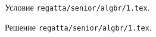 \problem
Условие \texttt{regatta/senior/algbr/1.tex}.

\solution Решение \texttt{regatta/senior/algbr/1.tex}.
\endproblem
